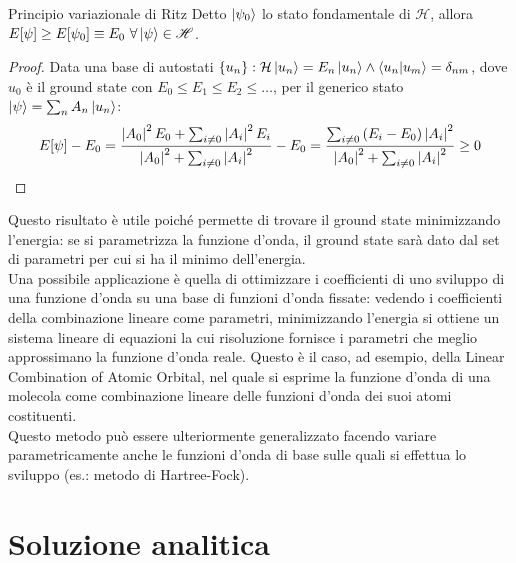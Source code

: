 \begin{theorem}{Principio variazionale di Ritz}{}
	Detto $ \ket{\psi_0} $ lo stato fondamentale di $ \mathcal{H} $, allora $ E[\psi] \ge E[\psi_0] \equiv E_0 \,\,\forall \ket{\psi} \in \mathscr{H} $.

	\tcblower
	\begin{proof}
		Data una base di autostati $ \{u_n\} : \mathcal{H} \ket{u_n} = E_n \ket{u_n} \land \braket{u_n | u_m} = \delta_{nm} $, dove $ u_0 $ è il ground state con $ E_0 \le E_1 \le E_2 \le \dots $, per il generico stato $ \ket{\psi} = \sum_n A_n \ket{u_n} $:
		\begin{equation*}
			E[\psi] - E_0
			= \frac{\left\lvert A_0\right\rvert^2 E_0 + \sum_{i \neq 0} \left\lvert A_i\right\rvert^2 E_i}{\left\lvert A_0\right\rvert^2 + \sum_{i \neq 0} \left\lvert A_i\right\rvert^2} - E_0 = \frac{\sum_{i \neq 0} \left( E_i - E_0 \right) \left\lvert A_i\right\rvert^2}{\left\lvert A_0\right\rvert^2 + \sum_{i \neq 0} \left\lvert A_i\right\rvert^2} \ge 0
		\end{equation*}
	\end{proof}
\end{theorem}

Questo risultato è utile poiché permette di trovare il ground state minimizzando l'energia: se si parametrizza la funzione d'onda, il ground state sarà dato dal set di parametri per cui si ha il minimo dell'energia.\\
Una possibile applicazione è quella di ottimizzare i coefficienti di uno sviluppo di una funzione d'onda su una base di funzioni d'onda fissate: vedendo i coefficienti della combinazione lineare come parametri, minimizzando l'energia si ottiene un sistema lineare di equazioni la cui risoluzione fornisce i parametri che meglio approssimano la funzione d'onda reale. Questo è il caso, ad esempio, della Linear Combination of Atomic Orbital, nel quale si esprime la funzione d'onda di una molecola come combinazione lineare delle funzioni d'onda dei suoi atomi costituenti.\\
Questo metodo può essere ulteriormente generalizzato facendo variare parametricamente anche le funzioni d'onda di base sulle quali si effettua lo sviluppo (es.: metodo di Hartree-Fock).

\section{Soluzione analitica}

